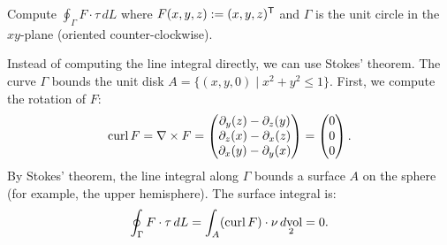 \begin{example}
\label{ex:stokes_path_integral}
Compute $\oint_\Gamma F \cdot \tau \,dL$ where $F(x,y,z) := (x, y, z)^{\mathsf{T}}$ and $\Gamma$ is the unit circle in the $xy$-plane (oriented counter-clockwise).

Instead of computing the line integral directly, we can use Stokes' theorem. The curve $\Gamma$ bounds the unit disk $A = \{(x,y,0) \mid x^2+y^2 \leq 1\}$.
First, we compute the rotation of $F$:
\[\operatorname{curl} F = \nabla \times F = \begin{pmatrix} \partial_y(z) - \partial_z(y) \\ \partial_z(x) - \partial_x(z) \\ \partial_x(y) - \partial_y(x) \end{pmatrix} = \begin{pmatrix} 0 \\ 0 \\ 0 \end{pmatrix}.\]
By Stokes' theorem, the line integral along $\Gamma$ bounds a surface $A$ on the sphere (for example, the upper hemisphere). The surface integral is:
\[\oint_\Gamma F \cdot \tau \,dL = \int_A (\operatorname{curl} F) \cdot \nu \mathop{d\text{vol}}_2 = 0.\]
\end{example}

